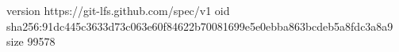version https://git-lfs.github.com/spec/v1
oid sha256:91dc445c3633d73c063e60f84622b70081699e5e0ebba863bcdeb5a8fdc3a8a9
size 99578
